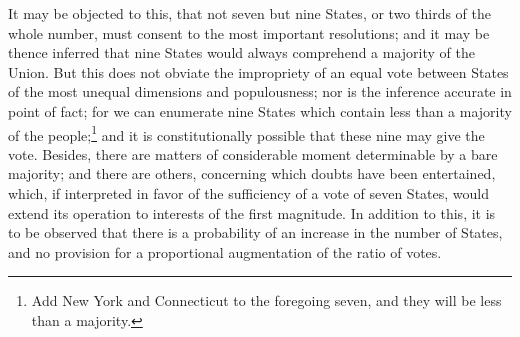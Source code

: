 It may be objected to this, that not seven but nine States, or two thirds of the whole number, must consent to the most important resolutions; and it may be thence inferred that nine States would always comprehend a majority of the Union. But this does not obviate the impropriety of an equal vote between States of the most unequal dimensions and populousness; nor is the inference accurate in point of fact; for we can enumerate nine States which contain less than a majority of the people;\footnote{Add New York and Connecticut to the foregoing seven, and they will be less than a majority.} and it is constitutionally possible that these nine may give the vote. Besides, there are matters of considerable moment determinable by a bare majority; and there are others, concerning which doubts have been entertained, which, if interpreted in favor of the sufficiency of a vote of seven States, would extend its operation to interests of the first magnitude. In addition to this, it is to be observed that there is a probability of an increase in the number of States, and no provision for a proportional augmentation of the ratio of votes.

